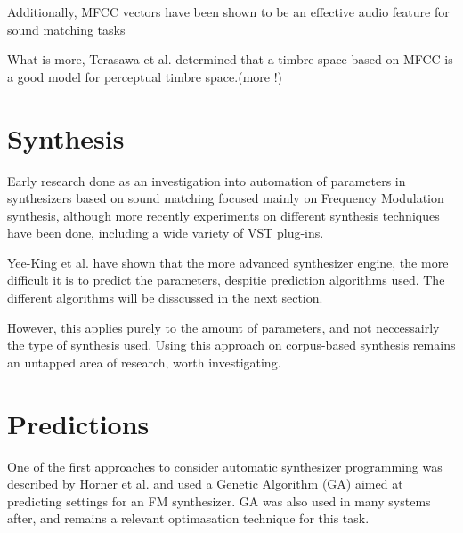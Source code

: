 Additionally, MFCC vectors have been shown to be an effective audio feature for
sound matching
tasks\cite{yee-king_synthbot:_nodate}\cite{heise_automated_2009}

What is more, Terasawa et al. determined that a timbre space based on
MFCC is a good model for perceptual timbre
space\cite{terasawa_center_2005}.(more !)


\section{Synthesis}

Early research done as an investigation into automation of parameters
in synthesizers based on sound matching focused mainly on Frequency
Modulation synthesis\cite{horner_machine_1993}, although more recently
experiments on different synthesis techniques have been
done\cite{dahlstedt_creating_nodate}\cite{yee-king_comparison_2011},
including a wide variety of VST
plug-ins\cite{yee-king_synthbot:_nodate}.

Yee-King et al. have shown that the more advanced synthesizer engine,
the more difficult it is to predict the parameters, despitie prediction
algorithms used\cite{yee-king_automatic_2018}. The different
algorithms will be disscussed in the next section.

However, this applies purely to the amount of parameters, and not
neccessairly the type of synthesis used. Using this approach on
corpus-based synthesis remains an untapped area of research, worth
investigating\cite{mcdonald_neural_2017}.


\section{Predictions}

One of the first approaches to consider automatic synthesizer
programming was described by Horner et al.\cite{horner_machine_1993}
 and used a Genetic
Algorithm (GA) aimed at predicting settings for an FM
synthesizer. GA was also used in many systems
after\cite{dahlstedt_creating_nodate}, and remains a relevant
optimasation technique for this task.

